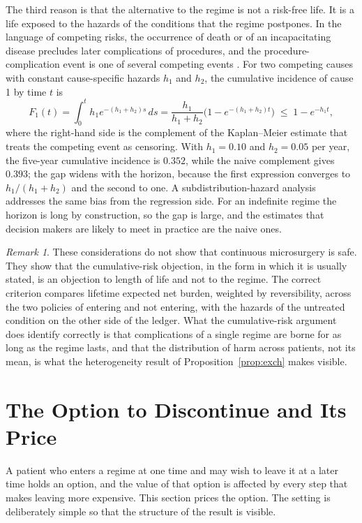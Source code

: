 \documentclass[11pt]{article}
\theoremstyle{plain}
\theoremstyle{definition}
\theoremstyle{remark}
\newtheorem{remark}{Remark}
\begin{document}
The third reason is that the alternative to the regime is not a risk-free life. It is a life exposed to the hazards of the conditions that the regime postpones. In the language of competing risks, the occurrence of death or of an incapacitating disease precludes later complications of procedures, and the procedure-complication event is one of several competing events \cite{austin2016}. For two competing causes with constant cause-specific hazards $h_1$ and $h_2$, the cumulative incidence of cause 1 by time $t$ is
\begin{equation}\label{eq:cif}
F_1(t)=\int_0^t h_1e^{-(h_1+h_2)s}\,ds=\frac{h_1}{h_1+h_2}\Big(1-e^{-(h_1+h_2)t}\Big)\;\le\;1-e^{-h_1t},
\end{equation}
where the right-hand side is the complement of the Kaplan--Meier estimate that treats the competing event as censoring. With $h_1=0.10$ and $h_2=0.05$ per year, the five-year cumulative incidence is $0.352$, while the naive complement gives $0.393$; the gap widens with the horizon, because the first expression converges to $h_1/(h_1+h_2)$ and the second to one. A subdistribution-hazard analysis \cite{finegray1999} addresses the same bias from the regression side. For an indefinite regime the horizon is long by construction, so the gap is large, and the estimates that decision makers are likely to meet in practice are the naive ones.

\begin{remark}
These considerations do not show that continuous microsurgery is safe. They show that the cumulative-risk objection, in the form in which it is usually stated, is an objection to length of life and not to the regime. The correct criterion compares lifetime expected net burden, weighted by reversibility, across the two policies of entering and not entering, with the hazards of the untreated condition on the other side of the ledger. What the cumulative-risk argument does identify correctly is that complications of a single regime are borne for as long as the regime lasts, and that the distribution of harm across patients, not its mean, is what the heterogeneity result of Proposition~\ref{prop:exch} makes visible.
\end{remark}

\section{The Option to Discontinue and Its Price}\label{sec:exit}

A patient who enters a regime at one time and may wish to leave it at a later time holds an option, and the value of that option is affected by every step that makes leaving more expensive. This section prices the option. The setting is deliberately simple so that the structure of the result is visible.
\end{document}
